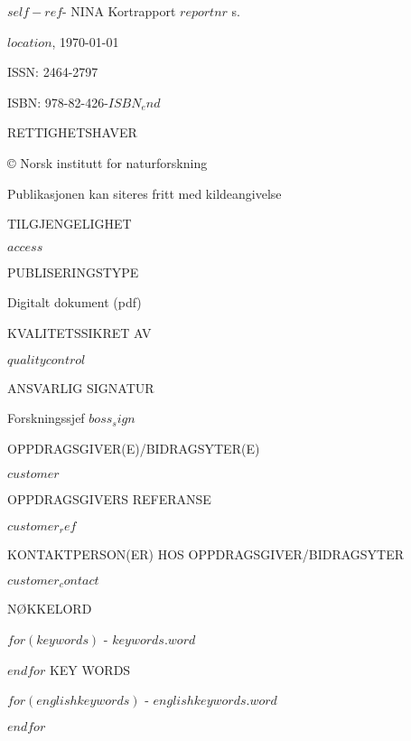 \documentclass[11pt, a4paper]{article}
\newcommand{\smallspace}{\vspace{3mm}}
\begin{document}
\footnotesize{$self-ref$}- NINA Kortrapport $reportnr$ \pageref{LastPage} s. \par \smallspace
$location$, \ninadate\today \par \smallspace
ISSN: 2464-2797 \par
ISBN: 978-82-426-$ISBN_end$ \par  \smallspace
{\footnotesize{RETTIGHETSHAVER}} \par
© Norsk institutt for naturforskning  \par
Publikasjonen kan siteres fritt med kildeangivelse \par \smallspace
{\footnotesize{TILGJENGELIGHET}} \par
$access$ \par \smallspace
{\footnotesize{PUBLISERINGSTYPE}} \par
Digitalt dokument (pdf) \par \smallspace
{\footnotesize{KVALITETSSIKRET AV}} \par
$qualitycontrol$ \par \smallspace
{\footnotesize{ANSVARLIG SIGNATUR}} \par
Forskningssjef $boss_sign$ \par \smallspace
{\footnotesize{OPPDRAGSGIVER(E)/BIDRAGSYTER(E)}} \par
$customer$ \par \smallspace
{\footnotesize{OPPDRAGSGIVERS REFERANSE}} \par
$customer_ref$ \par \smallspace
{\footnotesize{KONTAKTPERSON(ER) HOS OPPDRAGSGIVER/BIDRAGSYTER}} \par
$customer_contact$ \par \smallspace
{\footnotesize{NØKKELORD}} \par\smallskip
$for(keywords)$
\small{\hyp{} $keywords.word$} \par
$endfor$
\vspace{5mm}
KEY WORDS \par\smallskip
$for(englishkeywords)$
\small{\hyp{} $englishkeywords.word$} \par
$endfor$

\vfill
\end{document}
